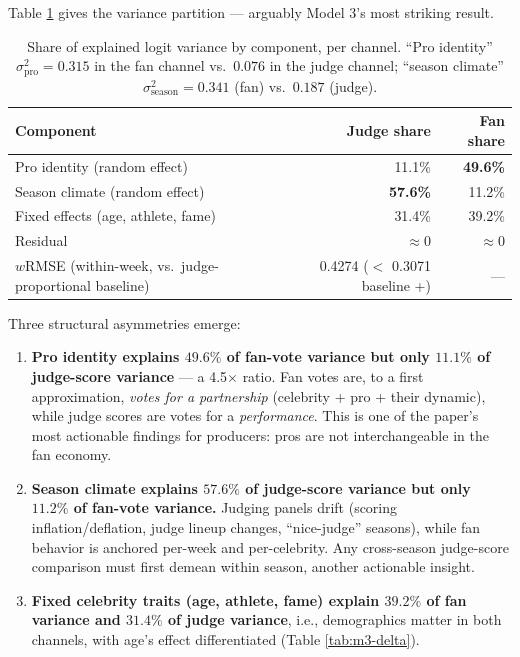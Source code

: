 \documentclass{article}
\begin{document}
Table \ref{tab:m3-varpart} gives the variance partition --- arguably Model 3's most striking result.

\begin{table}[H]
\centering
\caption{Share of explained logit variance by component, per channel. ``Pro identity'' $\sigma^2_{\text{pro}} = 0.315$ in the fan channel vs.\ $0.076$ in the judge channel; ``season climate'' $\sigma^2_{\text{season}} = 0.341$ (fan) vs.\ $0.187$ (judge).}
\label{tab:m3-varpart}
\begin{tabular}{lrr}
\toprule
Component & Judge share & Fan share \\
\midrule
Pro identity (random effect) & 11.1\% & \textbf{49.6\%} \\
Season climate (random effect) & \textbf{57.6\%} & 11.2\% \\
Fixed effects (age, athlete, fame) & 31.4\% & 39.2\% \\
Residual & $\approx 0$ & $\approx 0$ \\
\midrule
$w$RMSE (within-week, vs.\ judge-proportional baseline) & 0.4274 ($<$ 0.3071 baseline +) & --- \\
\bottomrule
\end{tabular}
\end{table}

Three structural asymmetries emerge:
\begin{enumerate}
  \item \textbf{Pro identity explains $49.6\%$ of fan-vote variance but only $11.1\%$ of judge-score variance} --- a 4.5$\times$ ratio. Fan votes are, to a first approximation, \emph{votes for a partnership} (celebrity + pro + their dynamic), while judge scores are votes for a \emph{performance}. This is one of the paper's most actionable findings for producers: pros are not interchangeable in the fan economy.
  \item \textbf{Season climate explains $57.6\%$ of judge-score variance but only $11.2\%$ of fan-vote variance.} Judging panels drift (scoring inflation/deflation, judge lineup changes, ``nice-judge'' seasons), while fan behavior is anchored per-week and per-celebrity. Any cross-season judge-score comparison must first demean within season, another actionable insight.
  \item \textbf{Fixed celebrity traits (age, athlete, fame) explain $39.2\%$ of fan variance and $31.4\%$ of judge variance}, i.e., demographics matter in both channels, with age's effect differentiated (Table \ref{tab:m3-delta}).
\end{enumerate}
\end{document}
